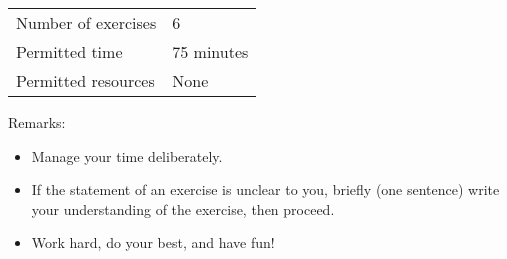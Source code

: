 \begin{center}
\begin{tabular}{l@{ : }l}
Number of exercises	&	6			\\
Permitted time		&	75 minutes	\\
Permitted resources	&	None
\end{tabular}
\end{center}
\vspace{.25in}
\noindent{}Remarks:
\begin{itemize}
\item Manage your time deliberately.
\item If the statement of an exercise is unclear to you, briefly (one sentence) write your understanding of the exercise, then proceed.
\item Work hard, do your best, and have fun!
\end{itemize}